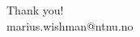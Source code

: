 \documentclass{beamer}
\begin{document}
\begin{frame}
	\centering
	\Large Thank you!\\
	\bigskip
	\bigskip
	\tiny marius.wishman@ntnu.no
\end{frame}



\end{document}
